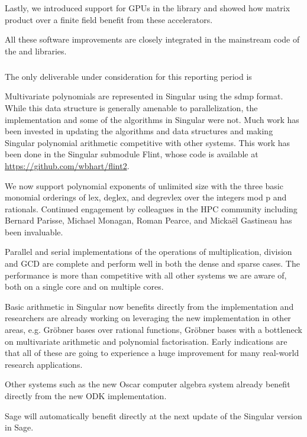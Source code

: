 Lastly, we introduced support for GPUs in the \fflasffpack library and showed how matrix product over a finite
field benefit from these accelerators.

All these software improvements are closely integrated in the mainstream code of the \fflasffpack and \Linbox libraries.

\medskip
\subparagraph{}
  \label{hpc@hpc-singular}

  The only deliverable under consideration for this reporting period
  is~

Multivariate polynomials are represented in Singular using the sdmp format. While this data structure is generally amenable to parallelization, the implementation and some of the algorithms in Singular were not. Much work has been invested in updating the algorithms and data structures and making Singular polynomial arithmetic competitive with other systems. This work has been done in the Singular submodule Flint, whose code is available at \url{https://github.com/wbhart/flint2}.

We now support polynomial exponents of unlimited size with the three basic monomial orderings of lex, deglex, and degrevlex over the integers mod p and rationals. Continued engagement by colleagues in the HPC community including Bernard Parisse, Michael Monagan, Roman Pearce, and Micka\"el Gastineau has been invaluable.

Parallel and serial implementations of the operations of multiplication, division and GCD are complete and perform well in both the dense and sparse cases. The performance is more than competitive with all other systems we are aware of, both on a single core and on multiple cores.

Basic arithmetic in Singular now benefits directly from the implementation and researchers are already working on leveraging the new implementation in other areas, e.g. Gr\"{o}bner bases over rational functions, Gr\"{o}bner bases with a bottleneck on multivariate arithmetic and polynomial factorisation. Early indications are that all of these are going to experience a huge improvement for many real-world research applications.

Other systems such as the new Oscar computer algebra system already benefit directly from the new ODK implementation. 

Sage will automatically benefit directly at the next update of the Singular version in Sage.

